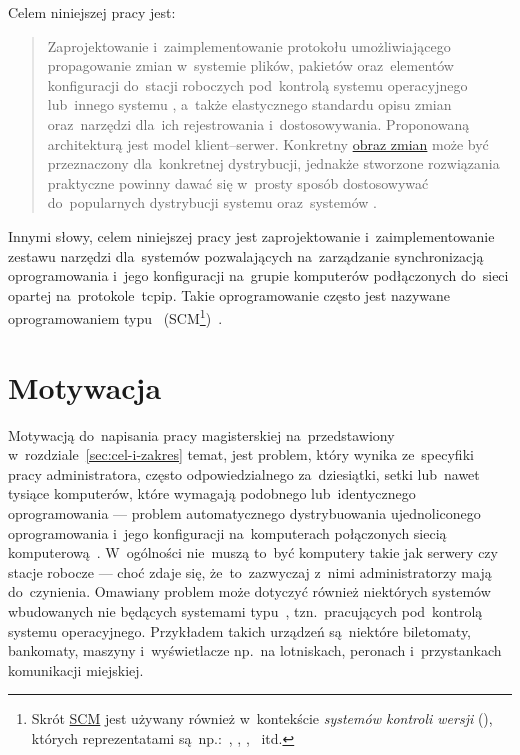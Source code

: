 \documentclass[thesis]{subfiles}
\begin{document}
\noindent Celem niniejszej pracy jest:\mynobreakpar
\blockcquote{formularz-zgloszenia-pracy}{Zaprojektowanie i~zaimplementowanie protokołu umożliwiającego propagowanie zmian w~systemie plików, pakietów oraz~elementów konfiguracji do~stacji roboczych pod~kontrolą systemu operacyjnego  lub~innego systemu , a~także elastycznego standardu opisu zmian oraz~narzędzi dla~ich rejestrowania i~dostosowywania. Proponowaną architekturą jest model klient--serwer. Konkretny \hyperref[sec:obraz-zmian-konfiguracji]{obraz zmian} może być przeznaczony dla~konkretnej dystrybucji, jednakże stworzone rozwiązania praktyczne powinny dawać się w~prosty sposób dostosowywać do~popularnych dystrybucji systemu  oraz~systemów .}
Innymi słowy, celem niniejszej pracy jest zaprojektowanie i~zaimplementowanie zestawu narzędzi dla~systemów  pozwalających na~zarządzanie synchronizacją oprogramowania i~jego konfiguracji na~grupie komputerów podłączonych do~sieci opartej na~protokole~\gls{tcpip}. Takie oprogramowanie często jest nazywane oprogramowaniem typu ~(SCM\footnote{Skrót \href{https://en.wikipedia.org/wiki/SCM}{SCM} jest używany również w~kontekście \emph{systemów kontroli wersji} (), których reprezentatami są~np.:~, , , ~itd.})~\cite{wiki:scm}.


\section{Motywacja}

Motywacją do~napisania pracy magisterskiej na~przedstawiony w~rozdziale~\ref{sec:cel-i-zakres} temat, jest problem, który wynika ze~specyfiki pracy administratora, często odpowiedzialnego za~dziesiątki, setki lub~nawet tysiące komputerów, które wymagają podobnego lub~identycznego oprogramowania --- problem automatycznego dystrybuowania ujednoliconego oprogramowania i~jego konfiguracji na~komputerach połączonych siecią komputerową~\cite{so-problem-intro}. W~ogólności nie~muszą to~być komputery takie jak serwery czy stacje robocze --- choć zdaje się, że~to~zazwyczaj z~nimi administratorzy mają do~czynienia. Omawiany problem może dotyczyć również niektórych systemów wbudowanych nie będących systemami typu~\mbox{}, tzn.~pracujących pod~kontrolą systemu operacyjnego. Przykładem takich urządzeń są~niektóre biletomaty, bankomaty, maszyny  i~wyświetlacze np.~na lotniskach, peronach i~przystankach komunikacji miejskiej.
\end{document}
